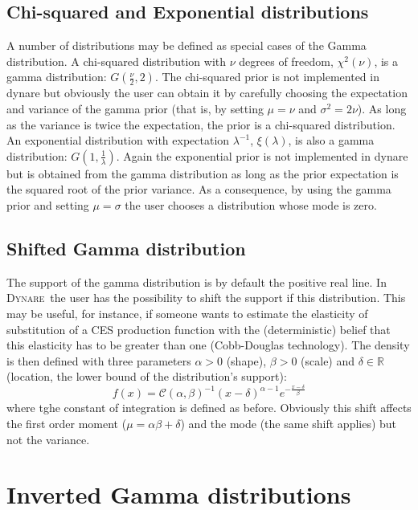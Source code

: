 \documentclass{amsart}
\theoremstyle{plain}
\theoremstyle{remark}
\numberwithin{equation}{section}
\newcommand{\Dynare}{\textsc{Dynare}}
\begin{document}
 \subsection{Chi-squared and Exponential distributions}\label{subsec:ChiAndExponentialDistributions}
 A number of distributions may be defined as special cases of the
 Gamma distribution. A chi-squared distribution with $\nu$ degrees of
 freedom, $\chi^2(\nu)$, is a gamma distribution:
 $G\left(\frac{\nu}{2},2\right)$. The chi-squared prior is not
 implemented in dynare but obviously the user can obtain it by
 carefully choosing the expectation and variance of the gamma prior
 (that is, by setting $\mu=\nu$ and $\sigma^2 = 2\nu$). As long as the
 variance is twice the expectation, the prior is a chi-squared
 distribution. An exponential distribution with expectation
 $\lambda^{-1}$, $\xi(\lambda)$, is also a gamma distribution:
 $G\left(1,\frac{1}{\lambda}\right)$. Again the exponential prior is
 not implemented in dynare but is obtained from the gamma distribution
 as long as the prior expectation is the squared root of the prior
 variance. As a consequence, by using the gamma prior and setting
 $\mu=\sigma$ the user chooses a distribution whose mode is zero.

 \subsection{Shifted Gamma distribution}\label{subsec:ShiftedGammaDistribution}
 The support of the gamma distribution is by default the positive real
 line. In \Dynare\ the user has the possibility to shift the support
 if this distribution. This may be useful, for instance, if someone
 wants to estimate the elasticity of substitution of a CES production
 function with the (deterministic) belief that this elasticity has to
 be greater than one (Cobb-Douglas technology). The density is then
 defined with three parameters $\alpha>0$ (shape), $\beta>0$ (scale)
 and $\delta\in\mathbb R$ (location, the lower bound of the
 distribution’s support):
 \[
   f(x) = \mathcal C(\alpha, \beta)^{-1}(x-\delta)^{\alpha-1}e^{-\frac{x-\delta}{\beta}}
 \]
 where tghe constant of integration is defined as before. Obviously
 this shift affects the first order moment ($\mu=\alpha\beta+\delta$)
 and the mode (the same shift applies) but not the variance.\newline

\section{Inverted Gamma distributions}\label{sec:InvertedGammaDistributions}
\end{document}
